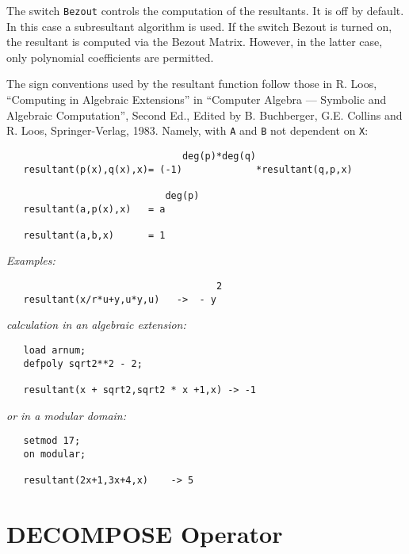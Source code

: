 The switch {\tt Bezout} controls the computation of the
resultants. It is off by default. In this case a subresultant algorithm
is used. If the switch Bezout is turned on, the resultant is computed via
the Bezout Matrix. However, in the latter case, only polynomial coefficients
are permitted.

\begin{samepage}
The sign conventions used by the resultant function follow those in R.
Loos, ``Computing in Algebraic Extensions'' in ``Computer Algebra --- Symbolic
and Algebraic Computation'', Second Ed., Edited by B. Buchberger, G.E.
Collins and R. Loos, Springer-Verlag, 1983. Namely, with {\tt A} and {\tt B}
not dependent on {\tt X}:

\begin{verbatim}
                               deg(p)*deg(q)
   resultant(p(x),q(x),x)= (-1)             *resultant(q,p,x)

                            deg(p)
   resultant(a,p(x),x)   = a

   resultant(a,b,x)      = 1
\end{verbatim}
\end{samepage}

{\it Examples:}

\begin{samepage}
\begin{verbatim}
                                     2
   resultant(x/r*u+y,u*y,u)   ->  - y
\end{verbatim}
\end{samepage}

{\it calculation in an algebraic extension:}

\begin{samepage}
\begin{verbatim}
   load arnum;
   defpoly sqrt2**2 - 2;

   resultant(x + sqrt2,sqrt2 * x +1,x) -> -1
\end{verbatim}
\end{samepage}

{\it or in a modular domain:}

\begin{samepage}
\begin{verbatim}
   setmod 17;
   on modular;

   resultant(2x+1,3x+4,x)    -> 5
\end{verbatim}
\end{samepage}
\section{DECOMPOSE Operator}

